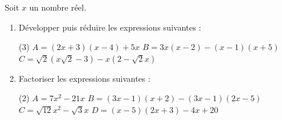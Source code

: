 \documentclass[10pt, a4paper]{article}
\begin{document}
\begin{Application}[][20 min]
Soit $x$ un nombre réel.
\begin{enumerate}
    \item Développer puis réduire les expressions suivantes :
    \begin{tasks}[label=$\bullet$, label-width=5pt, item-indent=15pt](3)
        \task $A = (2x + 3)(x - 4) + 5x$
        \task $B = 3x(x - 2) - (x - 1)(x + 5)$
        \task $C = \sqrt{2}(x\sqrt{2} - 3) - x(2 - \sqrt{2}x)$
    \end{tasks}

    \item Factoriser les expressions suivantes :
    \begin{tasks}[label=$\bullet$, label-width=5pt, item-indent=15pt](2)
        \task $A = 7x^2 - 21x$
        \task $B = (3x - 1)(x + 2) - (3x - 1)(2x - 5)$
        \task $C = \sqrt{12}x^2 - \sqrt{3}x$
        \task $D = (x - 5)(2x + 3) - 4x + 20$
    \end{tasks}
\end{enumerate}
\end{Application}
\end{document}
